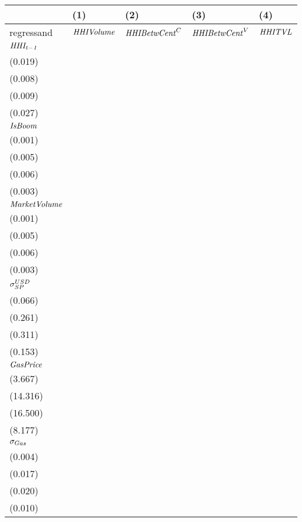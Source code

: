\begin{tabular}{lllll}
\toprule
{} &                                   (1) &                                  (2) &                                  (3) &                                    (4) \\
\midrule
regressand                &                     ${\it HHIVolume}$ &                ${\it HHIBetwCent}^C$ &                ${\it HHIBetwCent}^V$ &                         ${\it HHITVL}$ \\
$\it HHI_{t-1}$           &   \makecell{$0.799^{***}$ \\ (0.019)} &  \makecell{$0.962^{***}$ \\ (0.008)} &  \makecell{$0.957^{***}$ \\ (0.009)} &    \makecell{$0.543^{***}$ \\ (0.027)} \\
${\it IsBoom}$            &  \makecell{$-0.004^{***}$ \\ (0.001)} &  \makecell{$0.013^{***}$ \\ (0.005)} &  \makecell{$0.017^{***}$ \\ (0.006)} &    \makecell{$0.008^{***}$ \\ (0.003)} \\
${\it MarketVolume}$      &    \makecell{$-0.003^{*}$ \\ (0.001)} &    \makecell{$-0.000^{}$ \\ (0.005)} &    \makecell{$-0.001^{}$ \\ (0.006)} &     \makecell{$-0.005^{*}$ \\ (0.003)} \\
${\it \sigma}^{USD}_{SP}$ &      \makecell{$0.007^{}$ \\ (0.066)} &    \makecell{$-0.111^{}$ \\ (0.261)} &    \makecell{$-0.171^{}$ \\ (0.311)} &   \makecell{$-0.660^{***}$ \\ (0.153)} \\
${\it GasPrice}$          &     \makecell{$-3.235^{}$ \\ (3.667)} &   \makecell{$14.400^{}$ \\ (14.316)} &    \makecell{$6.408^{}$ \\ (16.500)} &  \makecell{$-21.341^{***}$ \\ (8.177)} \\
${\it \sigma}_{Gas}$      &   \makecell{$-0.011^{**}$ \\ (0.004)} &     \makecell{$0.005^{}$ \\ (0.017)} &     \makecell{$0.005^{}$ \\ (0.020)} &       \makecell{$0.003^{}$ \\ (0.010)} \\

\end{tabular}
